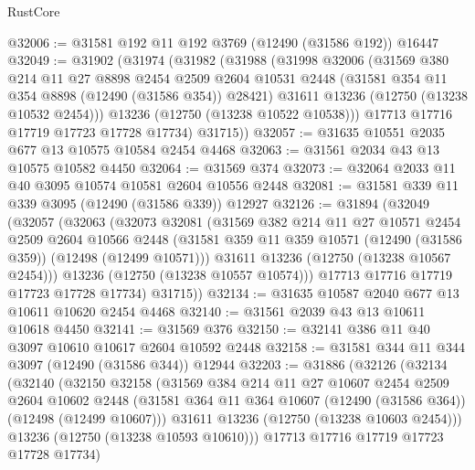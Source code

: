 \begin{lexlean}{RustCore}
\begin{coremodule}
@32006 := @31581 @192 @11 @192 @3769 (@12490 (@31586 @192)) @16447
@32049 := @31902
    (@31974
      (@31982
        (@31988
          (@31998
            @32006
            (@31569
              @380
              @214
              @11
              @27
              @8898
              @2454
              @2509
              @2604
              @10531
              @2448
              (@31581 @354 @11 @354 @8898 (@12490 (@31586 @354)) @28421)
              @31611
              @13236
              (@12750 (@13238 @10532 @2454)))
            @13236
            (@12750 (@13238 @10522 @10538)))
          @17713
          @17716
          @17719
          @17723
          @17728
          @17734)
        @31715))
@32057 := @31635 @10551 @2035 @677 @13 @10575 @10584 @2454 @4468
@32063 := @31561 @2034 @43 @13 @10575 @10582 @4450
@32064 := @31569 @374
@32073 := @32064 @2033 @11 @40 @3095 @10574 @10581 @2604 @10556 @2448
@32081 := @31581 @339 @11 @339 @3095 (@12490 (@31586 @339)) @12927
@32126 := @31894
    (@32049
      (@32057
        (@32063
          (@32073
            @32081
            (@31569
              @382
              @214
              @11
              @27
              @10571
              @2454
              @2509
              @2604
              @10566
              @2448
              (@31581 @359 @11 @359 @10571 (@12490 (@31586 @359)) (@12498 (@12499 @10571)))
              @31611
              @13236
              (@12750 (@13238 @10567 @2454)))
            @13236
            (@12750 (@13238 @10557 @10574)))
          @17713
          @17716
          @17719
          @17723
          @17728
          @17734)
        @31715))
@32134 := @31635 @10587 @2040 @677 @13 @10611 @10620 @2454 @4468
@32140 := @31561 @2039 @43 @13 @10611 @10618 @4450
@32141 := @31569 @376
@32150 := @32141 @386 @11 @40 @3097 @10610 @10617 @2604 @10592 @2448
@32158 := @31581 @344 @11 @344 @3097 (@12490 (@31586 @344)) @12944
@32203 := @31886
    (@32126
      (@32134
        (@32140
          (@32150
            @32158
            (@31569
              @384
              @214
              @11
              @27
              @10607
              @2454
              @2509
              @2604
              @10602
              @2448
              (@31581 @364 @11 @364 @10607 (@12490 (@31586 @364)) (@12498 (@12499 @10607)))
              @31611
              @13236
              (@12750 (@13238 @10603 @2454)))
            @13236
            (@12750 (@13238 @10593 @10610)))
          @17713
          @17716
          @17719
          @17723
          @17728
          @17734)

\end{coremodule}
\end{lexlean}
